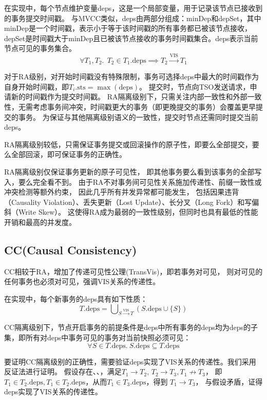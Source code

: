 在实现中，每个节点维护变量deps，这是一个局部变量，用于记录该节点已接收到的事务提交时间戳。
与MVCC类似，deps由两部分组成：minDep和depSet，其中minDep是一个时间戳，表示小于等于该时间戳的所有事务都已被该节点接收，
depSet是时间戳大于minDep且已被该节点接收的事务时间戳集合。deps表示当前节点可见的事务集合。
\begin{equation}
    \forall T_1, T_2.\ \ T_2 \in T_1.\text{deps} \implies T_2 \xrightarrow{\text{VIS}} T_1
\end{equation}

对于RA级别，对开始时间戳没有特殊限制，事务可选择deps中最大的时间戳作为自身开始时间戳，即$T_i.\text{sts} = \max(\text{deps})$。
提交时，节点向TSO发送\tock 请求，申请新的时间戳作为提交时间戳。
RA隔离级别下，只需关注内部一致性和外部一致性，无需考虑事务间冲突，时间戳更大的事务（即更晚提交的事务）会覆盖更早提交的事务。
为保证与其他隔离级别语义的一致性，提交时节点还需同时提交当前deps。

RA隔离级别较低，只需保证事务提交或回滚操作的原子性，即要么全部提交，要么全部回滚，即可保证事务的正确性。

RA隔离级别仅保证事务更新的原子可见性，
即其他事务要么看到该事务的全部写入，要么完全看不到。
由于RA不对事务间可见性关系施加传递性、前缀一致性或冲突检测等额外约束，
因此几乎所有并发异常都可能发生，
包括因果违背（Causality Violation）、丢失更新（Lost Update）、长分叉（Long Fork）和写偏斜（Write Skew）。
这使得RA成为最弱的一致性级别，但同时也具有最低的性能开销和最高的并发度。

\subsection{CC(Causal Consistency)}

CC相较于RA，增加了传递可见性公理(TransVis)，即若事务\Txc[1]对\Txc[2]可见，
则对\Txc[1]可见的任何事务也必须对\Txc[2]可见，强调VIS关系的传递性。

在实现中，每个新事务的deps具有如下性质：
\begin{equation}
    T.\text{deps} = \bigcup\nolimits_{S \xrightarrow{\text{VIS}} T} (S.\text{deps} \cup \{S\})
\end{equation}

CC隔离级别下，节点开启事务的前提条件是deps中所有事务的deps均为deps的子集，即所有对deps中事务可见的事务对当前快照必须可见：
\begin{equation}
    \forall S \in T.\text{deps}.\ S.\text{deps} \subseteq T.\text{deps}
\end{equation}

要证明CC隔离级别的正确性，需要验证deps实现了VIS关系的传递性。我们采用反证法进行证明。
假设存在\Txc[1]、\Txc[2]、\Txc[3]，满足$T_1 \xrightarrow{} T_2$, $T_2 \xrightarrow{} T_3, T_1 \nrightarrow T_3$，
即$T_1 \in T_2.\text{deps}, T_1 \in T_2.\text{deps}$，从而$T_1 \in T_3.\text{deps}$，得到 $T_1 \xrightarrow{} T_3$，
与假设矛盾，证得deps实现了VIS关系的传递性。

